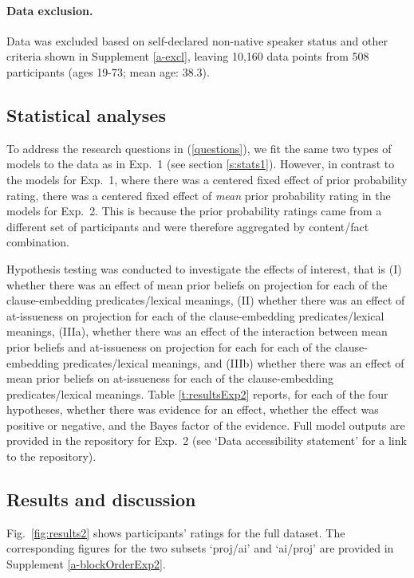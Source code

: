 \documentclass[11pt,fleqn]{article}
\newcommand{\6}{\mbox{$[\hspace*{-.6mm}[$}}
\newcommand{\9}{\mbox{$]\hspace*{-.6mm}]$}}
\begin{document}
\paragraph{Data exclusion.} Data was excluded based on self-declared non-native speaker status and other criteria shown in Supplement \ref{a-excl}, leaving 10,160 data points from 508 participants (ages 19-73; mean age: 38.3).

\subsection{Statistical analyses}

To address the research questions in (\ref{questions}), we fit the same two types of models to the data as in Exp.~1 (see section \ref{s:stats1}). However, in contrast to the models for Exp.~1, where there was a centered fixed effect of prior probability rating, there was a centered fixed effect of {\em mean} prior probability rating in the models for Exp.~2. This is because the prior probability ratings came from a different set of participants and were therefore aggregated by content/fact combination.

Hypothesis testing was conducted to investigate the effects of interest, that is (I) whether there was an effect of mean prior beliefs on projection for each of the clause-embedding predicates/lexical meanings, (II) whether there was an effect of at-issueness on projection for each of the clause-embedding predicates/lexical meanings, (IIIa), whether there was an effect of the interaction between mean prior beliefs and at-issueness on projection for each  for each of the clause-embedding predicates/lexical meanings, and (IIIb) whether there was an effect of mean prior beliefs on at-issueness for each of the clause-embedding predicates/lexical meanings. Table \ref{t:resultsExp2} reports, for each of the four hypotheses, whether there was evidence for an effect, whether the effect was positive or negative, and the Bayes factor of the evidence. Full model outputs are provided in the repository for Exp.~2 (see `Data accessibility statement' for a link to the repository).

\subsection{Results and discussion}

Fig.~\ref{fig:results2} shows participants' ratings for the full dataset. The corresponding figures for the two subsets `proj/ai' and `ai/proj' are provided in Supplement \ref{a-blockOrderExp2}.
\end{document}
